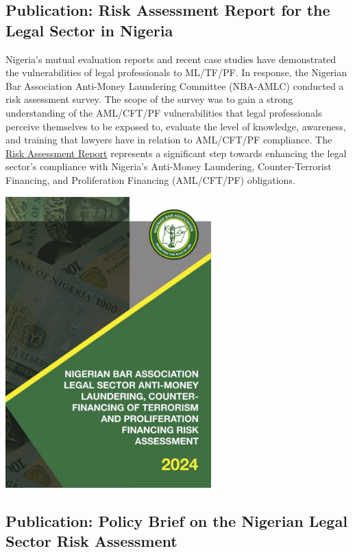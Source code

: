 \documentclass[
  letterpaper,
  DIV=11,
  numbers=noendperiod]{scrreprt}
\begin{document}
\subsection{Publication: Risk Assessment Report for the Legal Sector in
Nigeria}\label{publication-risk-assessment-report-for-the-legal-sector-in-nigeria}

Nigeria's mutual evaluation reports and recent case studies have
demonstrated the vulnerabilities of legal professionals to ML/TF/PF. In
response, the Nigerian Bar Association Anti-Money Laundering Committee
(NBA-AMLC) conducted a risk assessment survey. The scope of the survey
was to gain a strong understanding of the AML/CFT/PF vulnerabilities
that legal professionals perceive themselves to be exposed to, evaluate
the level of knowledge, awareness, and training that lawyers have in
relation to AML/CFT/PF compliance. The
\href{https://africancenterdev.org/nba-legal-sector-risk-assessment-report-2024}{Risk
Assessment Report} represents a significant step towards enhancing the
legal sector's compliance with Nigeria's Anti-Money Laundering,
Counter-Terrorist Financing, and Proliferation Financing (AML/CFT/PF)
obligations.

\begin{center}
\includegraphics[width=3.125in,height=\textheight,keepaspectratio]{images/strengthen/17_risk_report.png}
\end{center}

\subsection{Publication: Policy Brief on the Nigerian Legal Sector Risk
Assessment}\label{publication-policy-brief-on-the-nigerian-legal-sector-risk-assessment}
\end{document}
